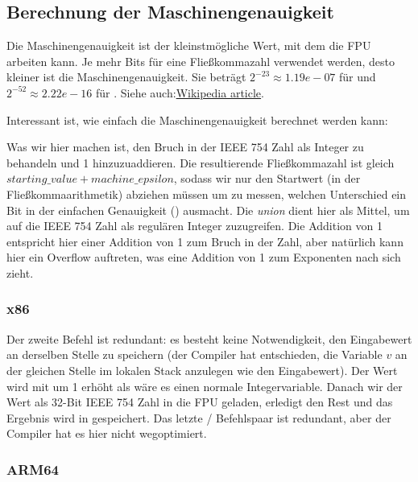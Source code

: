 \subsection{Berechnung der Maschinengenauigkeit}
Die Maschinengenauigkeit ist der kleinstmögliche Wert, mit dem die \ac{FPU} arbeiten kann.
Je mehr Bits für eine Fließkommazahl verwendet werden, desto kleiner ist die Maschinengenauigkeit.
Sie beträgt $2^{-23} \approx 1.19e-07$ für \Tfloat und $2^{-52} \approx 2.22e-16$ für \Tdouble.
Siehe auch:\href{https://en.wikipedia.org/wiki/Arithmetic_underflow}{Wikipedia article}.

Interessant ist, wie einfach die Maschinengenauigkeit berechnet werden kann:


Was wir hier machen ist, den Bruch in der IEEE 754 Zahl als Integer zu behandeln und 1 hinzuzuaddieren.
Die resultierende Fließkommazahl ist gleich $starting\_value+machine\_epsilon$, sodass wir nur den Startwert (in der
Fließkommaarithmetik) abziehen müssen um zu messen, welchen Unterschied ein Bit in der einfachen Genauigkeit (\Tfloat)
ausmacht.
Die \emph{union} dient hier als Mittel, um auf die IEEE 754 Zahl als regulären Integer zuzugreifen.
Die Addition von 1 entspricht hier einer Addition von 1 zum Bruch in der Zahl, aber natürlich kann hier ein Overflow
auftreten, was eine Addition von 1 zum Exponenten nach sich zieht.

\subsubsection{x86}


Der zweite  Befehl ist redundant: es besteht keine Notwendigkeit, den Eingabewert an derselben Stelle zu
speichern (der Compiler hat entschieden, die Variable $v$ an der gleichen Stelle im lokalen Stack anzulegen wie den
Eingabewert).
Der Wert wird mit  um 1 erhöht als wäre es einen normale Integervariable.
Danach wir der Wert als 32-Bit IEEE 754 Zahl in die FPU geladen,  erledigt den Rest und das Ergebnis wird in
 gespeichert.
Das letzte / Befehlspaar ist redundant, aber der Compiler hat es hier nicht wegoptimiert.

\subsubsection{ARM64}

